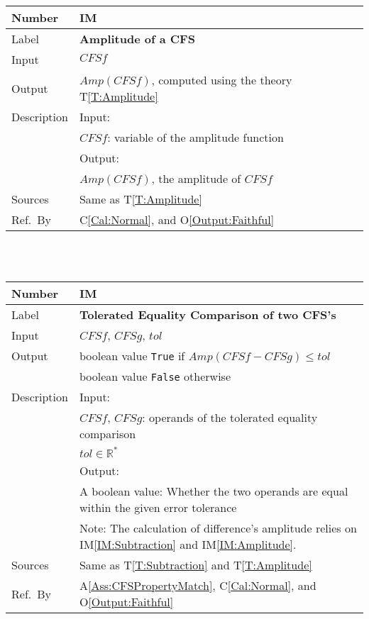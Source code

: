 \documentclass[12pt]{article}
\newcommand{\colAwidth}{0.13\textwidth}
\newcommand{\colBwidth}{0.82\textwidth}
\newcommand{\tref}[1]{T\ref{#1}}
\newcommand{\aref}[1]{A\ref{#1}}
\newcommand{\calref}[1]{C\ref{#1}}
\newcommand{\oref}[1]{O\ref{#1}}
\newcounter{instnum} %
\newcommand{\iref}[1]{IM\ref{#1}}
\begin{document}
\noindent
\begin{minipage}{\textwidth}
	\renewcommand*{\arraystretch}{1.5}
	\begin{tabular}{| p{\colAwidth} | p{\colBwidth}|}
		\hline
		\rowcolor[gray]{0.9}
		Number& IM{instnum}\theinstnum 
		\label{IM:Amplitude}\\
		\hline
		Label& \bf Amplitude of a CFS \\
		\hline
		Input& $\mathit{CFSf}$\\
		\hline
		Output& $\mathit{Amp}(\mathit{CFSf})$, computed using the theory 
		\tref{T:Amplitude}\\
		\hline
		Description&Input:\\
		&$\mathit{CFSf}$: variable of the amplitude function\\
		&Output:\\
		& $\mathit{Amp}(\mathit{CFSf})$, the amplitude of $\mathit{CFSf}$\\
		\hline
		Sources&Same as \tref{T:Amplitude}		\\
		\hline
		Ref.\ By & \calref{Cal:Normal}, and  \oref{Output:Faithful}\\
		\hline
	\end{tabular}
\end{minipage}\\
~\newline

\noindent
\begin{minipage}{\textwidth}
       	\renewcommand*{\arraystretch}{1.5}
	\begin{tabular}{| p{\colAwidth} | p{\colBwidth}|}
		\hline
		\rowcolor[gray]{0.9}
		Number& IM{instnum}\theinstnum 
		\label{IM:ToleratedEquality}\\
		\hline
		Label& \bf Tolerated Equality Comparison of two CFS's \\
		\hline
		Input& $\mathit{CFSf}$, $\mathit{CFSg}$, $\mathit{tol}$\\
		\hline
		Output& boolean value \texttt{True} if 
		$\mathit{Amp}(\mathit{CFSf}-\mathit{CFSg})\leq \mathit{tol}$\\
		&boolean value \texttt{False} otherwise\\
		\hline
		Description&Input:\\
		&$\mathit{CFSf}$, $\mathit{CFSg}$: operands of 
		the tolerated equality comparison\\
		&$\mathit{tol}\in\mathbb{R}^{*}$\\
		&Output:\\
		& A boolean value: Whether the two operands are equal 
		within the given error tolerance\\
		&Note: The calculation of difference's amplitude 
		relies on \iref{IM:Subtraction} and \iref{IM:Amplitude}.\\
		\hline
		Sources&Same as \tref{T:Subtraction} and \tref{T:Amplitude}\\
		\hline
		Ref.\ By & \aref{Ass:CFSPropertyMatch}, \calref{Cal:Normal}, 
		and \oref{Output:Faithful}\\
		\hline
	\end{tabular}
\end{minipage}\\
~\newline
\end{document}

